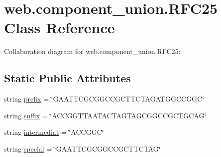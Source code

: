 \hypertarget{classweb_1_1component__union_1_1_r_f_c25}{\section{web.\-component\-\_\-union.\-R\-F\-C25 Class Reference}
\label{classweb_1_1component__union_1_1_r_f_c25}
}


Collaboration diagram for web.\-component\-\_\-union.\-R\-F\-C25\-:
\subsection*{Static Public Attributes}
\begin{DoxyCompactItemize}
\item 
string \hyperlink{classweb_1_1component__union_1_1_r_f_c25_a587bc92d42da35b284da4ed8640671b4}{prefix} = \char`\"{}G\-A\-A\-T\-T\-C\-G\-C\-G\-G\-C\-C\-G\-C\-T\-T\-C\-T\-A\-G\-A\-T\-G\-G\-C\-C\-G\-G\-C\char`\"{}
\item 
string \hyperlink{classweb_1_1component__union_1_1_r_f_c25_aa03490fe92d2f1fcd5d2e80ff4e7f0ef}{suffix} = \char`\"{}A\-C\-C\-G\-G\-T\-T\-A\-A\-T\-A\-C\-T\-A\-G\-T\-A\-G\-C\-G\-G\-C\-C\-G\-C\-T\-G\-C\-A\-G\char`\"{}
\item 
string \hyperlink{classweb_1_1component__union_1_1_r_f_c25_aa0147ee39e138732307cb519eb0f1bd2}{intermediat} = \char`\"{}A\-C\-C\-G\-G\-C\char`\"{}
\item 
string \hyperlink{classweb_1_1component__union_1_1_r_f_c25_a8a8f68d525379ed3db9ab285a202d4fc}{special} = \char`\"{}G\-A\-A\-T\-T\-C\-G\-C\-G\-G\-C\-C\-G\-C\-T\-T\-C\-T\-A\-G\char`\"{}
\end{DoxyCompactItemize}


